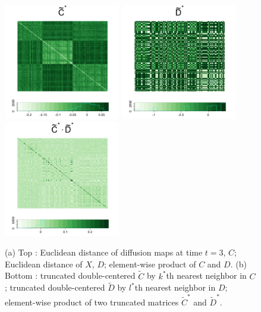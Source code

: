 \documentclass[12pt]{article}
\theoremstyle{definition}
\begin{document}
\begin{figure}[H]
	\includegraphics[width=2in]{../Figure/tildeCtrunc.png}
	\includegraphics[width=2in]{../Figure/tildeDtrunc.png}
	\includegraphics[width=2in]{../Figure/tildeCDtrunc.png}
	\caption{(a) Top : Euclidean distance of diffusion maps at time $t=3$, $C$; Euclidean distance of $X$, $D$; element-wise product of $C$ and $D$. (b) Bottom : truncated double-centered  $\tilde{C}$ by $k^{*}$th nearest neighbor in $C$; truncated double-centered $\tilde{D}$ by $l^{*}$th nearest neighbor in $D$; element-wise product of two truncated matrices $\tilde{C}^{*}$ and $\tilde{D}^{*}$. }
	\label{fig:MGCmatrices}
\end{figure}	
\end{document}
